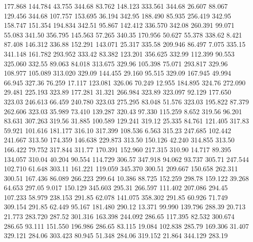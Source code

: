  177.868  144.784   43.755       344.68
  83.762  148.123  333.561       344.68
  26.607   88.067  129.456       344.68
 107.757  153.695   36.194       342.95
 188.490   85.935  256.419       342.95
 158.747  151.354  194.834       342.51
  95.867  142.412  336.570       342.08
 260.391   99.071   55.083       341.50
 356.795  145.563   57.265       340.35
 170.956   50.627   55.378       338.62
   8.421   87.408  146.312       336.88
 152.291  143.071   25.317       335.58
 209.946   86.497    7.075       335.15
 341.148  161.782  293.952       333.42
  83.382  123.201  356.625       332.99
 112.399   90.553  325.060       332.55
  89.063   84.018  313.675       329.96
 105.398   75.071  293.817       329.96
 108.977  105.089  313.020       329.09
 144.455   29.160   95.515       329.09
 167.945   49.994   66.945       327.36
  76.259   17.117  123.081       326.06
  70.249   12.955  184.895       324.76
 272.090   29.481  225.193       323.89
 177.281   31.321  266.984       323.89
 323.097   92.129  177.650       323.03
 246.613   66.459  240.780       323.03
 275.295   83.048   51.576       323.03
 195.822   87.379  262.606       323.03
  35.989   73.410  139.287       320.43
  97.330  115.259    8.652       319.56
  96.201   83.631  307.263       319.56
  31.885  100.589  129.241       319.12
  25.335   84.761  121.405       317.83
  59.921  101.616  181.177       316.10
 317.399  108.536    6.563       315.23
 247.685  102.442  241.667       313.50
 174.359  146.638  229.873       313.50
 150.126   42.240  314.855       313.50
 166.422   79.752  317.844       311.77
 170.391  152.960  217.315       310.90
  14.717   89.395  134.057       310.04
  40.204   90.554  114.729       306.57
 347.918   94.062   93.737       305.71
 247.544  102.710   61.648       303.11
 161.221  119.059  345.370       300.51
 209.667  150.658  262.311       300.51
 167.436   86.089  266.223       299.64
  10.386   88.725  152.259       298.78
 159.122   39.268   64.653       297.05
   9.017  150.129  345.603       295.31
 266.597  111.402  207.086       294.45
 107.233   58.979  238.153       291.85
  62.078  141.075  358.302       291.85
  60.926   71.749  309.154       291.85
  62.449   95.167  181.480       290.12
  13.371   99.990  139.796       288.39
  20.713   21.773  283.720       287.52
 301.316  163.398  244.092       286.65
 117.395   82.532  300.674       286.65
  93.111  151.550  196.986       286.65
  83.115   19.084  102.838       285.79
 169.306   31.407  329.121       284.06
 303.423   80.945   51.348       284.06
 319.152   21.864  344.129       283.19
